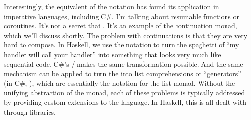 Interestingly, the equivalent of the  notation has found its
application in imperative languages, including C\#. I'm talking
about resumable functions or coroutines. It's not a secret that
. It's an example of the continuation monad, which we'll
discuss shortly. The problem with continuations is that they are very
hard to compose. In Haskell, we use the  notation to turn the
spaghetti of ``my handler will call your handler'' into something that
looks very much like sequential code. C\#'s /
makes the same transformation possible. And the same mechanism can be applied to
turn the
 into list comprehensions or ``generators'' (in C\#,
), which are
essentially the  notation for the list monad. Without the
unifying abstraction of the monad, each of these problems is typically
addressed by providing custom extensions to the language. In Haskell,
this is all dealt with through libraries.
